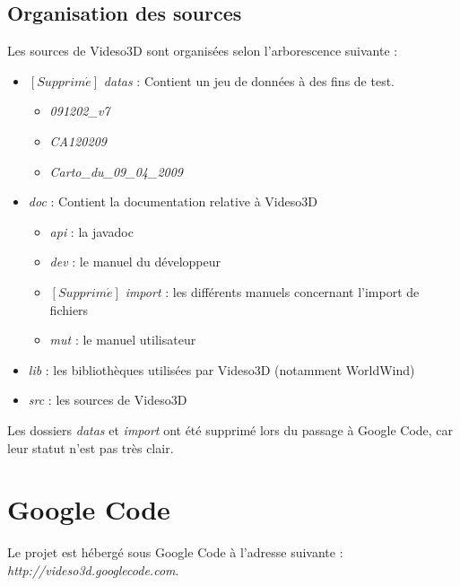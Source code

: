 \documentclass[a4paper, titlepage]{article}
\begin{document}
\subsection{Organisation des sources}
Les sources de Videso3D sont organisées selon l'arborescence suivante :
\begin{itemize}
  \item $\left[Supprim\acute{e}\right]$ \emph{datas} : Contient un jeu de
  données à des fins de test.
 		\begin{itemize}
           \item \emph{091202\_v7}
           \item \emph{CA120209}
           \item \emph{Carto\_du\_09\_04\_2009}
        \end{itemize}
  \item \emph{doc} : Contient la documentation relative à Videso3D
  		\begin{itemize}
           \item \emph{api} : la javadoc
           \item \emph{dev} : le manuel du développeur
           \item $\left[Supprim\acute{e}\right]$ \emph{import} : les différents
           manuels concernant l'import de fichiers
           \item \emph{mut} : le manuel utilisateur
        \end{itemize} 
  \item \emph{lib} : les bibliothèques utilisées par Videso3D (notamment
  WorldWind)
  \item \emph{src} : les sources de Videso3D
\end{itemize}
Les dossiers \emph{datas} et \emph{import} ont été supprimé lors du passage à
Google Code, car leur statut n'est pas très clair.
\section{Google Code}
Le projet est hébergé sous Google Code à l'adresse suivante :
\emph{http://videso3d.googlecode.com}.
\end{document}
